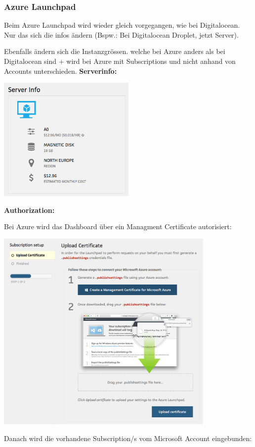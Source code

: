 \subsubsection{Azure Launchpad}
Beim Azure Launchpad wird wieder gleich vorgegangen, wie bei Digitalocean.
Nur das sich die infos ändern (Bspw.: Bei Digitalocean Droplet, jetzt Server).

Ebenfalls ändern sich die Instanzgrössen. welche bei Azure anders als bei 
Digitalocean sind + wird bei Azure mit Subscriptions und nicht anhand von 
Accounts unterschieden.
\textbf{Serverinfo:}

\includegraphics[width=0.5\textwidth]{./03_Analyse/03_Bitnami/images/azure_serverinfo}

\textbf{Authorization:}

Bei Azure wird das Dashboard über ein Managment Certificate autorisiert:

\includegraphics[width=0.8\textwidth]{./03_Analyse/03_Bitnami/images/azure_authorize}

Danach wird die vorhandene Subscription/s vom Microsoft Account eingebunden:

